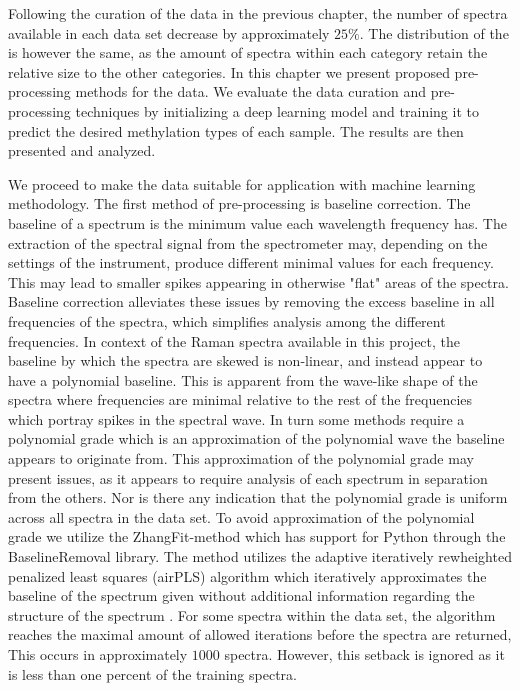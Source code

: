 Following the curation of the data in the previous chapter, the number of spectra available in each data set decrease by approximately $25\%$. The distribution of the is however the same, as the amount of spectra within each category retain the relative size to the other categories. In this chapter we present proposed pre-processing methods for the data. We evaluate the data curation and pre-processing techniques by initializing a deep learning model and training it to predict the desired methylation types of each sample. The results are then presented and analyzed.

We proceed to make the data suitable for application with machine learning methodology. The first method of pre-processing is baseline correction. The baseline of a spectrum is the minimum value each wavelength frequency has. The extraction of the spectral signal from the spectrometer may, depending on the settings of the instrument, produce different minimal values for each frequency. This may lead to smaller spikes appearing in otherwise "flat" areas of the spectra. Baseline correction alleviates these issues by removing the excess baseline in all frequencies of the spectra, which simplifies analysis among the different frequencies. In context of the Raman spectra available in this project, the baseline by which the spectra are skewed is non-linear, and instead appear to have a polynomial baseline. This is apparent from the wave-like shape of the spectra where frequencies are minimal relative to the rest of the frequencies which portray spikes in the spectral wave. In turn some methods require a polynomial grade which is an approximation of the polynomial wave the baseline appears to originate from. This approximation of the polynomial grade may present issues, as it appears to require analysis of each spectrum in separation from the others. Nor is there any indication that the polynomial grade is uniform across all spectra in the data set. To avoid approximation of the polynomial grade we utilize the ZhangFit-method which has support for Python through the BaselineRemoval library. The method utilizes the adaptive iteratively rewheighted penalized least squares (airPLS) algorithm which iteratively approximates the baseline of the spectrum given without additional information regarding the structure of the spectrum \cite{zhang2010baseline}. For some spectra within the data set, the algorithm reaches the maximal amount of allowed iterations before the spectra are returned, This occurs in approximately $1000$ spectra. However, this setback is ignored as it is less than one percent of the training spectra. 

